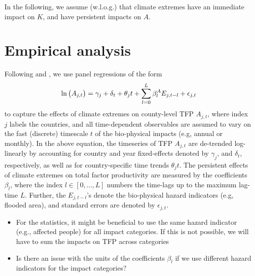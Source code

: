 \documentclass[preprint,3p,authoryear]{elsarticle}
\begin{document}
In the following, we assume (w.l.o.g.) that climate extremes have an immediate impact on $K$, and have persistent impacts on $A$.

\section{Empirical analysis}
\label{sec:empAna}
Following \citet{BAK19} and \citet{HSI14}, we use panel regressions of the form
\begin{equation}
  \label{eq:PRA}
  \ln\big(A_{j,t}\big) = \gamma_j + \delta_{t} + \theta_j t + \sum_{l=0}^{L}\beta^A_{l}E_{j,t-l}+\epsilon_{j,t}
\end{equation}
to capture the effects of climate extremes on county-level TFP $A_{j,t}$, where index $j$ labels the countries, and all time-dependent observables are assumed to vary on the fast (discrete) timescale $t$ of the bio-physical impacts (e.g, annual or monthly).
In the above equation, the timeseries of TFP $A_{j,t}$ are de-trended log-linearly by accounting for country and year fixed-effects denoted by $\gamma_j$, and $\delta_t$, respectively, as well as for country-specific time trends $\theta_j t$. The persistent effects of climate extremes on total factor productivity are measured by the coefficients $\beta_l$, where the index $l\in[0,\ldots,L]$ numbers the time-lags up to the maximum lag-time $L$. Further, the $E_{j,t-l}$'s denote the bio-physical hazard indicators (e.g, flooded area), and standard errors are denoted by $\epsilon_{j,t}$.
\begin{itemize}
\item For the statistics, it might be beneficial to use the same hazard indicator (e.g., affected people) for all impact categories. If this is not possible, we will have to sum the impacts on TFP across categories
  \item Is there an issue with the units of the coefficients $\beta_l$ if we use different hazard indicators for the impact categories?
\end{itemize}
\end{document}
